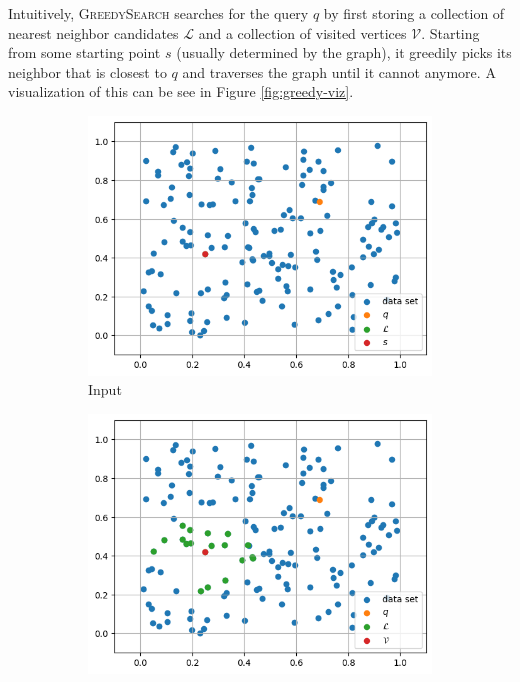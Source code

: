 Intuitively, \textsc{GreedySearch} searches for the query \(q\) by first storing a collection of nearest neighbor candidates \(\mathcal{L}\) and a collection of visited vertices \(\mathcal{V}\). Starting from some starting point \(s\) (usually determined by the graph), it greedily picks its neighbor that is closest to \(q\) and traverses the graph until it cannot anymore. A visualization of this can be see in Figure \ref{fig:greedy-viz}.

\begin{figure}[ht]
    \centering
    \hfill
    \begin{subfigure}{0.31\textwidth}
        \includegraphics[width=\textwidth]{images/greedy-search-begin}
        \caption{Input}
    \end{subfigure}
    \hfill
    \begin{subfigure}{0.31\textwidth}
        \includegraphics[width=\textwidth]{images/greedy-search-1}

\end{subfigure}
\end{figure}
